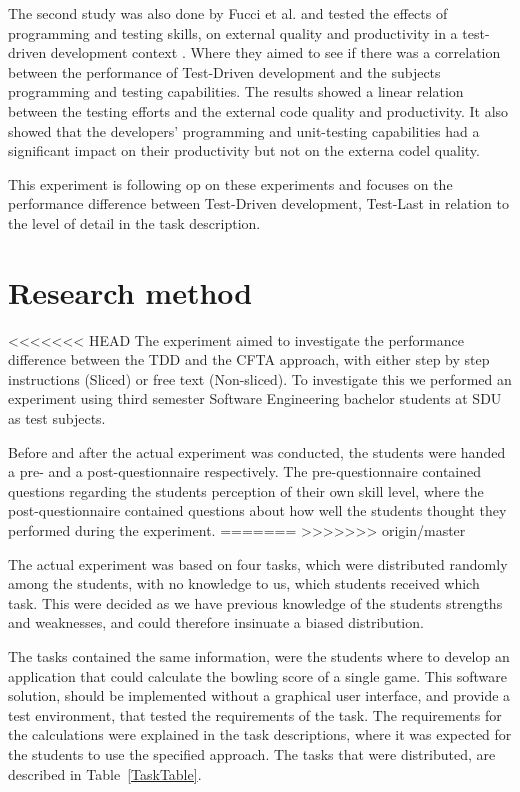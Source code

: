 \documentclass{sig-alternate-05-2015}
\begin{document}
The second study was also done by Fucci et al. and tested the effects of programming and testing skills, on external quality and productivity in a test-driven development context \cite{fucci1}. Where they aimed to see if there was a correlation between the performance of Test-Driven development and the subjects programming and testing capabilities. The results showed a linear relation between the testing efforts and the external code quality and productivity. It also showed that the developers' programming and unit-testing capabilities had a significant impact on their productivity but not on the externa codel quality.

This  experiment is following op on these experiments and focuses on the performance difference between Test-Driven development, Test-Last  in relation to the level of detail in the task description.

\section{Research method}

\label{sec:Research method}

<<<<<<< HEAD
The experiment aimed to investigate the performance difference between the TDD and the CFTA approach, with either step by step instructions (Sliced) or free text (Non-sliced). To investigate this we performed an experiment using third semester Software Engineering bachelor students at SDU as test subjects.

Before and after the actual experiment was conducted, the students were handed a pre- and a post-questionnaire respectively.
The pre-questionnaire contained questions regarding the students perception of their own skill level, where the post-questionnaire contained questions about how well the students thought they performed during the experiment.
=======
>>>>>>> origin/master

The actual experiment was based on four tasks, which were distributed randomly among the students, with no know\-ledge to us, which students received which task. This were decided as we have previous knowledge of the students strengths and weaknesses, and could therefore insinuate a biased distribution.

The tasks contained the same information, were the students where to develop an application that could calculate the bow\-ling score of a single game. This software solution, should be implemented without a graphical user interface, and provide a test environment, that tested the requirements of the task. The requirements for the calculations were explained in the task descriptions, where it was expected for the students to use the specified approach.
The tasks that were distributed, are described in Table~\ref{TaskTable}.
\end{document}
